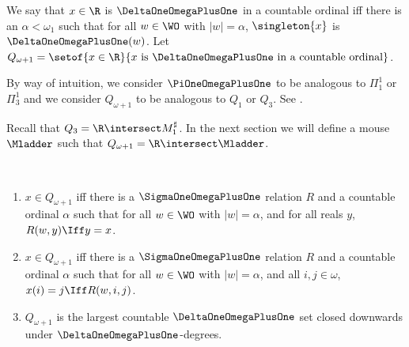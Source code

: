 \documentclass[oneside,12pt]{amsart}
\begin{document}
\begin{definition}
We say that $x\in\R$ is $\DeltaOneOmegaPlusOne$ in a countable ordinal iff there is an $\alpha<\omega_1$ such
that for all $w\in\WO$ with $|w|=\alpha$, $\singleton{x}$ is $\DeltaOneOmegaPlusOne(w)$.
Let $Q_{\omega+1} = \setof{x\in\R}{x\text{ is }\DeltaOneOmegaPlusOne\text{ in a countable ordinal}}$.
\end{definition}

By way of intuition, we consider $\PiOneOmegaPlusOne$ to be analogous to
$\Pi^1_1$ or $\Pi^1_3$ and we consider $Q_{\omega+1}$ to be analogous to
$Q_1$ or $Q_3$. See \cite{Q_Theory}.

Recall that $Q_3 = \R \intersect M_1^{\sharp}$. In the next section we will
define a mouse $\Mladder$ such that $Q_{\omega+1} = \R\intersect\Mladder$.

\begin{remarks} \
\begin{enumerate}
\item $x\in Q_{\omega+1}$ iff there is a $\SigmaOneOmegaPlusOne$ relation $R$ and
a countable ordinal $\alpha$ such that for all $w\in\WO$ with $|w|=\alpha$,
and for all reals $y$, $R(w,y) \Iff y=x$.
\item $x\in Q_{\omega+1}$ iff there is a $\SigmaOneOmegaPlusOne$ relation $R$
and a countable ordinal $\alpha$ such
that for all $w\in\WO$ with $|w|=\alpha$, and all $i,j\in\omega$,
$x(i)=j \Iff R(w,i,j)$.
\item $Q_{\omega+1}$ is the largest countable
$\DeltaOneOmegaPlusOne$ set closed downwards under
$\DeltaOneOmegaPlusOne$-degrees.
\end{enumerate}
\end{remarks}
\end{document}
